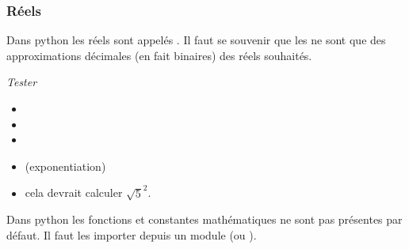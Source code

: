\subsubsection{Réels}
Dans python les réels sont appelés .
Il faut se souvenir que les  ne sont que des approximations décimales (en fait binaires) des réels souhaités.
\begin{Exercise}
{\it Tester
\begin{itemize}

\item {}

\item {}

\item {}

\item {} (exponentiation)

\item {} cela devrait calculer $\sqrt 5^2$.

\end{itemize}
}
\end{Exercise}
\medskip

Dans python les fonctions et constantes mathématiques ne sont pas présentes par défaut.
Il faut les importer depuis un module  (ou ).

